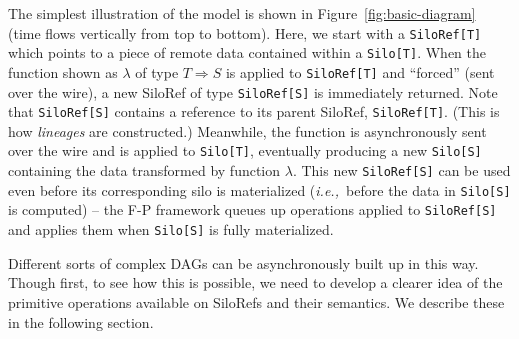 \documentclass[preprint]{sigplanconf}
\theoremstyle{definition}
\theoremstyle{definition}
\newcommand{\ie}{{\em i.e.,~}}
\begin{document}
The simplest illustration of the model is shown in Figure~\ref{fig:basic-diagram}
(time flows vertically from top to bottom). Here, we start with a
\verb|SiloRef[T]| which points to a piece of remote data contained within a
\verb|Silo[T]|. When the function shown as $\lambda$ of type $T \Rightarrow S$
is applied to \verb|SiloRef[T]| and ``forced'' (sent over the wire), a new
SiloRef of type \verb|SiloRef[S]| is immediately returned. Note that
\verb|SiloRef[S]| contains a reference to its parent SiloRef,
\verb|SiloRef[T]|. (This is how {\em lineages} are constructed.) Meanwhile, the
function is asynchronously sent over the wire and is applied to
\verb|Silo[T]|, eventually producing a new \verb|Silo[S]| containing the data
transformed by function $\lambda$. This new \verb|SiloRef[S]| can be
used even before its corresponding silo is materialized (\ie before the data
in \verb|Silo[S]| is computed) – the F-P framework queues up operations
applied to \verb|SiloRef[S]| and applies them when \verb|Silo[S]| is fully
materialized.

Different sorts of complex DAGs can be asynchronously built up in this way.
Though first, to see how this is possible, we need to develop a clearer idea
of the primitive operations available on SiloRefs and their semantics. We
describe these in the following section.
\end{document}
